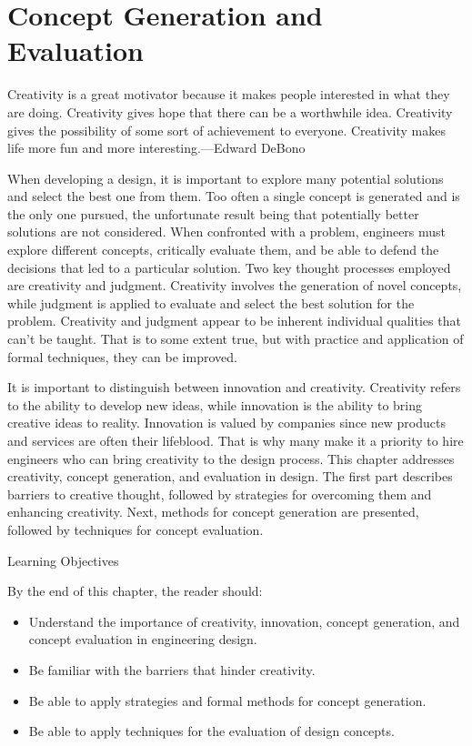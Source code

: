 \section{Concept Generation and
Evaluation}\label{concept-generation-and-evaluation}

Creativity is a great motivator because it makes people interested in
what they are doing. Crea­tivity gives hope that there can be a
worthwhile idea. Creativity gives the possibility of some sort of
achievement to everyone. Creativity makes life more fun and more
interesting.---Edward DeBono

When developing a design, it is important to explore many potential
solutions and select the best one from them. Too often a single concept
is generated and is the only one pursued, the unfortunate result being
that potentially better solutions are not considered. When confronted
with a problem, engineers must explore different concepts, critically
evaluate them, and be able to defend the decisions that led to a
particular solution. Two key thought processes employed are creativity
and judgment. Creativity involves the generation of novel con­cepts,
while judgment is applied to evaluate and select the best solution for
the problem. Creativity and judgment appear to be inherent individual
qualities that can't be taught. That is to some extent true, but with
practice and application of formal techniques, they can be im­proved.

It is important to distinguish between innovation and creativity.
Creativity refers to the ability to develop new ideas, while innovation
is the ability to bring creative ideas to reality. Innovation is valued
by companies since new products and services are often their life­blood.
That is why many make it a priority to hire engineers who can bring
creativity to the design process. This chapter addresses creativity,
concept generation, and evaluation in design. The first part describes
barriers to creative thought, followed by strategies for overcoming them
and enhancing creativity. Next, methods for concept generation are
presented, followed by techniques for concept evaluation.

Learning Objectives

By the end of this chapter, the reader should:

\begin{itemize}
\item
  Understand the importance of creativity, innovation, concept
  generation, and concept evaluation in engineering design.
\item
  Be familiar with the barriers that hinder creativity.
\item
  Be able to apply strategies and formal methods for concept generation.
\item
  Be able to apply techniques for the evaluation of design concepts.
\end{itemize}


